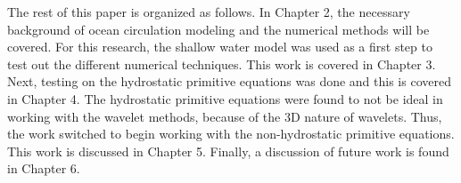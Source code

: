 The rest of this paper is organized as follows.  In Chapter 2, the necessary background of ocean circulation modeling and the numerical methods will be covered.  For this research, the shallow water model was used as a first step to test out the different numerical techniques.  This work is covered in Chapter 3.  Next, testing on the hydrostatic primitive equations was done and this is covered in Chapter 4.  The hydrostatic primitive equations were found to not be ideal in working with the wavelet methods, because of the 3D nature of wavelets.  Thus, the work switched to begin working with the non-hydrostatic primitive equations.  This work is discussed in Chapter 5.  Finally, a discussion of future work is found in Chapter 6. 

